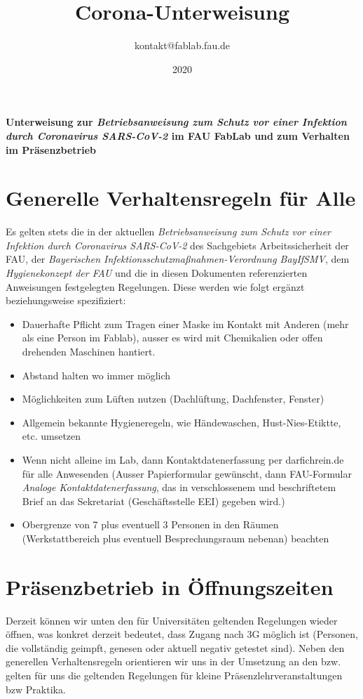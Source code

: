\documentclass[13pt]{\basedir/fablab-document}
\date{2020}
\author{kontakt@fablab.fau.de}
\title{Corona-Unterweisung}
\begin{document}
\maketitle

\begin{center}
  \textbf{Unterweisung zur \emph{Betriebsanweisung zum Schutz vor einer Infektion durch Coronavirus SARS-CoV-2} im FAU FabLab und zum Verhalten im Präsenzbetrieb}
\end{center}

\vbox{\vspace{1cm}}


\section{Generelle Verhaltensregeln für Alle}
Es gelten stets die in der aktuellen 
\emph{Betriebsanweisung zum Schutz vor einer Infektion durch Coronavirus SARS-CoV-2} des Sachgebiets Arbeitssicherheit der FAU, 
der \emph{Bayerischen Infektionsschutzmaßnahmen-Verordnung BayIfSMV}, 
dem \emph{Hygienekonzept der FAU} und 
die in diesen Dokumenten referenzierten Anweisungen 
festgelegten Regelungen. Diese werden wie folgt ergänzt beziehungsweise spezifiziert: 

\begin{itemize}
  \item  Dauerhafte Pflicht zum Tragen einer Maske im Kontakt mit Anderen (mehr als eine Person im Fablab), ausser es wird mit Chemikalien oder offen drehenden Maschinen hantiert.
  \item  Abstand halten wo immer möglich
  \item  Möglichkeiten zum Lüften nutzen (Dachlüftung, Dachfenster, Fenster)
  \item  Allgemein bekannte Hygieneregeln, wie Händewaschen, Hust-Nies-Etiktte, etc. umsetzen
  \item  Wenn nicht alleine im Lab, dann Kontaktdatenerfassung per darfichrein.de für alle Anwesenden (Ausser Papierformular gewünscht, dann FAU-Formular \emph{Analoge Kontaktdatenerfassung}, das in verschlossenem und beschriftetem Brief an das Sekretariat (Geschäftsstelle EEI) gegeben wird.) 
  \item  Obergrenze von 7 plus eventuell 3 Personen in den Räumen (Werkstattbereich plus eventuell Besprechungsraum nebenan) beachten
\end{itemize}


\section{Präsenzbetrieb in Öffnungszeiten}
Derzeit können wir unten den für Universitäten geltenden Regelungen wieder öffnen, was konkret derzeit bedeutet, dass Zugang nach 3G möglich ist (Personen, die vollständig geimpft, genesen oder aktuell negativ getestet sind).
Neben den generellen Verhaltensregeln orientieren wir uns in der Umsetzung an den bzw. gelten für uns die geltenden Regelungen für kleine Präsenzlehrveranstaltungen bzw Praktika.
\end{document}
